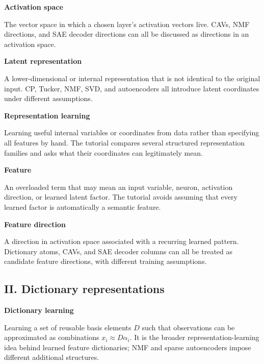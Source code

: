\documentclass[10pt]{article}
\newenvironment{glossaryentry}[1]{%
  \par\medskip\noindent
  {\large\bfseries #1}\par\smallskip
}{\par\medskip}
\begin{document}
\begin{glossaryentry}{Activation space}
The vector space in which a chosen layer's activation vectors live. CAVs, NMF directions, and SAE decoder directions can all be discussed as directions in an activation space.
\par{}
\end{glossaryentry}


\begin{glossaryentry}{Latent representation}
A lower-dimensional or internal representation that is not identical to the original input. CP, Tucker, NMF, SVD, and autoencoders all introduce latent coordinates under different assumptions.

\end{glossaryentry}


\begin{glossaryentry}{Representation learning}
Learning useful internal variables or coordinates from data rather than specifying all features by hand. The tutorial compares several structured representation families and asks what their coordinates can legitimately mean.

\end{glossaryentry}


\begin{glossaryentry}{Feature}
An overloaded term that may mean an input variable, neuron, activation direction, or learned latent factor. The tutorial avoids assuming that every learned factor is automatically a semantic feature.

\end{glossaryentry}


\begin{glossaryentry}{Feature direction}
A direction in activation space associated with a recurring learned pattern. Dictionary atoms, CAVs, and SAE decoder columns can all be treated as candidate feature directions, with different training assumptions.
\par{}
\end{glossaryentry}


\subsection{II. Dictionary representations}

\begin{glossaryentry}{Dictionary learning}
Learning a set of reusable basis elements $D$ such that observations can be approximated as combinations $x_i\approx D\alpha_i$. It is the broader representation-learning idea behind learned feature dictionaries; NMF and sparse autoencoders impose different additional structures.
\par\smallskip{\small\color{muted}[MBPS09]}
\end{glossaryentry}
\end{document}
